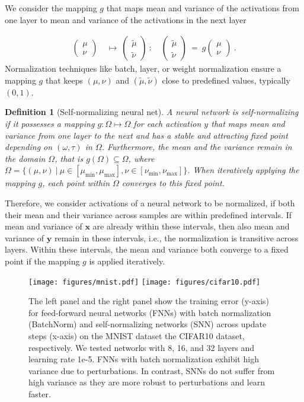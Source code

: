 \documentclass{article}
\newtheorem{definition}{Definition}
\newcommand\Bx{\bm{x}}
\newcommand\By{\bm{y}}
\newcommand\munn{{\tilde \mu}}
\newcommand\nunn{{\tilde \nu}}
\begin{document}
We consider the mapping $g$ that maps mean and variance of the activations from one layer
to mean and variance of the activations in the next layer 


\begin{align}
\begin{pmatrix}
\mu \\ \nu
\end{pmatrix}
\ &\mapsto \ 
\begin{pmatrix}
\munn \\ \nunn
\end{pmatrix} \ : \quad
\begin{pmatrix}
\munn \\ \nunn
\end{pmatrix}
  \ = \ g 
\begin{pmatrix}
\mu \\ \nu
\end{pmatrix}
 \ . 
\end{align}
Normalization techniques like batch, layer, or weight normalization 
ensure a mapping $g$ that keeps 
$(\mu,\nu)$ and $(\munn,\nunn)$
close to predefined values, typically $(0,1)$. 
\begin{definition}[Self-normalizing neural net] 
\label{def:SNN}
A neural network is self-normalizing if it possesses a mapping 
$g:\Omega \mapsto \Omega$ for each activation $y$ that maps mean and variance from one layer to the next 
and has a stable and attracting fixed point depending on $(\omega,\tau)$ in $\Omega$.
Furthermore, the mean and the variance remain in the domain $\Omega$, that is $g(\Omega) \subseteq \Omega$, where
$\Omega= \{ (\mu, \nu)\ |\ \mu \in [\mu_{\min},\mu_{\max}], \nu \in [\nu_{\min},\nu_{\max}] \}$.
When iteratively applying the mapping $g$, each point within $\Omega$ converges to this fixed point.
\end{definition}
Therefore, we consider activations of a neural network to be normalized, 
if both their mean and their variance across samples are within predefined intervals. 
If mean and variance of $\Bx$ are already within these intervals, then also
mean and variance of $\By$ remain in these intervals, i.e., the
normalization is transitive across layers. Within these intervals, 
the mean and variance both converge to a fixed point if the mapping $g$ is applied
iteratively. 


\setlength{\belowcaptionskip}{0pt}
\begin{figure}
 \texttt{[image: figures/mnist.pdf]}
 \texttt{[image: figures/cifar10.pdf]}
 \caption[FNN and SNN trainin error curves]{The left panel and the right panel show the training error (y-axis) for feed-forward neural networks (FNNs) with batch
   normalization (BatchNorm) and self-normalizing networks (SNN) across update steps (x-axis)
   on the MNIST dataset the CIFAR10 dataset, respectively.  
   We tested networks with 8, 16, and 32 layers and learning rate 1e-5. FNNs 
   with batch normalization exhibit high variance due to perturbations. 
   In contrast, SNNs do not suffer from high variance as they are
   more robust to perturbations and learn faster.  \label{fig:perturb}}
\end{figure}
\end{document}
